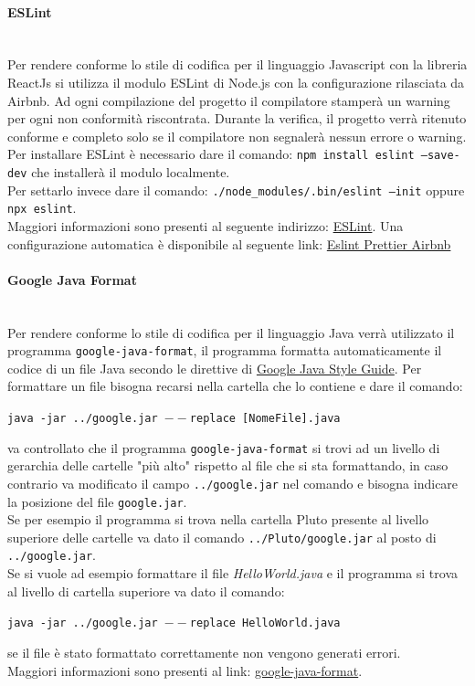 \paragraph{ESLint}\mbox{}\\
Per rendere conforme lo stile di codifica per il linguaggio Javascript con la libreria ReactJs si utilizza il modulo ESLint di Node.js con la configurazione rilasciata da Airbnb. Ad ogni compilazione del progetto il compilatore stamperà un warning per ogni non conformità riscontrata. Durante la verifica, il progetto verrà ritenuto conforme e completo solo se il compilatore non segnalerà nessun errore o warning.\\
Per installare ESLint è necessario dare il comando: \texttt{npm install eslint --save-dev} che installerà il modulo localmente.\\
Per settarlo invece dare il comando: \texttt{./node\_modules/.bin/eslint --init} oppure \texttt{npx eslint}.\\
Maggiori informazioni sono presenti al seguente indirizzo: \href{https://eslint.org/}{ESLint}.
Una configurazione automatica è disponibile al seguente link: \href{https://github.com/paulolramos/eslint-prettier-airbnb-react}{Eslint Prettier Airbnb}

\paragraph{Google Java Format}\mbox{}\\
Per rendere conforme lo stile di codifica per il linguaggio Java verrà utilizzato il programma \texttt{google-java-format}, il programma formatta automaticamente il codice di un file Java secondo le direttive di \href{https://google.github.io/styleguide/javaguide.html}{Google Java Style Guide}.
Per formattare un file bisogna recarsi nella cartella che lo contiene e  dare il comando: 
\begin{center}
	 \texttt{java -jar ../google.jar $--$replace [NomeFile].java}
\end{center}
va controllato che il programma \texttt{google-java-format} si trovi ad un livello di gerarchia delle cartelle "più alto" rispetto al file che si sta formattando, in caso contrario va modificato il campo \texttt{../google.jar} nel comando e bisogna indicare la posizione del file \texttt{google.jar}. \\
Se per esempio il programma si trova nella cartella Pluto presente al livello superiore delle cartelle va dato il comando \texttt{../Pluto/google.jar} al posto di \texttt{../google.jar}.\\
Se si vuole ad esempio formattare il file \textit{HelloWorld.java} e il programma si trova al livello di cartella superiore va dato il comando: 
\begin{center}
\texttt{java -jar ../google.jar $--$replace HelloWorld.java}
\end{center}
se il file è stato formattato correttamente non vengono generati errori.\\
Maggiori informazioni sono presenti al link: \href{https://github.com/google/google-java-format}{google-java-format}.

